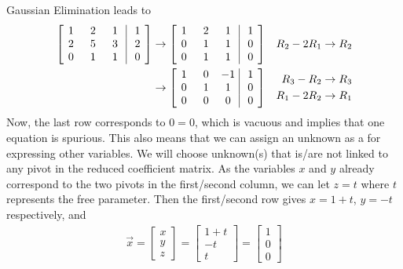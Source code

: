 \begin{solution} 
Gaussian Elimination leads to
\begin{align*}
\left[\begin{array}{@{\,}wc{10pt}wc{10pt}wc{10pt}|wc{10pt}@{\,}}
1 & 2 & 1 & 1 \\
2 & 5 & 3 & 2 \\
0 & 1 & 1 & 0
\end{array}\right] 
& \to 
\left[\begin{array}{@{\,}wc{10pt}wc{10pt}wc{10pt}|wc{10pt}@{\,}}
1 & 2 & 1 & 1 \\
0 & 1 & 1 & 0 \\
0 & 1 & 1 & 0
\end{array}\right] 
& R_2 - 2R_1 \to R_2 \\
& \to 
\left[\begin{array}{@{\,}wc{10pt}wc{10pt}wc{10pt}|wc{10pt}@{\,}}
1 & 0 & -1 & 1 \\
0 & 1 & 1 & 0 \\
0 & 0 & 0 & 0
\end{array}\right] 
& \begin{aligned}
R_3-R_2 &\to R_3 \\
R_1-2R_2 &\to R_1    
\end{aligned}
\end{align*}
Now, the last row corresponds to $0 = 0$, which is vacuous and implies that one equation is spurious. This also means that we can assign an unknown as a  for expressing other variables. We will choose unknown(s) that is/are not linked to any pivot in the reduced coefficient matrix. As the variables $x$ and $y$ already correspond to the two pivots in the first/second column, we can let $z = t$ where $t$ represents the free parameter. Then the first/second row gives $x = 1+t$, $y = -t$ respectively, and
\begin{align*}
\vec{x} = 
\begin{bmatrix}
x \\
y \\
z
\end{bmatrix}
=
\begin{bmatrix}
1+t \\
-t \\
t
\end{bmatrix}
=
\begin{bmatrix}
1 \\
0 \\
0
\end{bmatrix}

\end{align*}
\end{solution}
